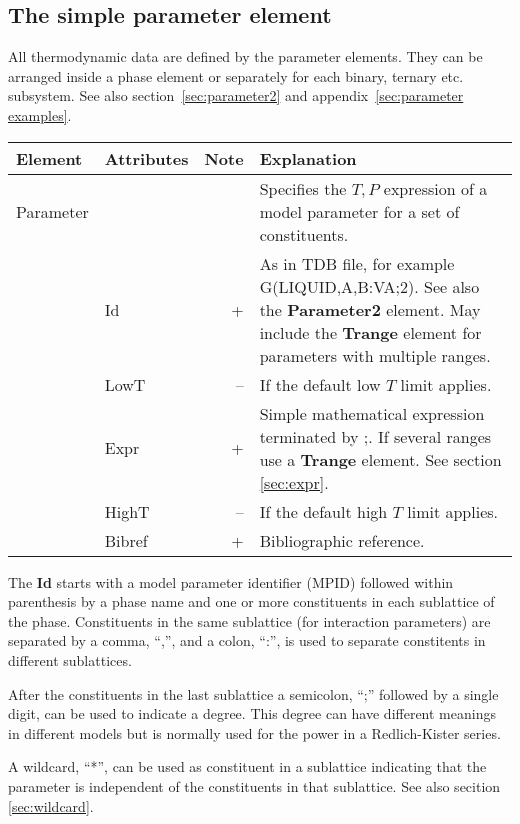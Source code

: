 \documentclass{article}
\begin{document}

\newpage 

\subsection{The simple parameter element}

All thermodynamic data are defined by the parameter elements.  They
can be arranged inside a phase element or separately for each binary,
ternary etc. subsystem.  See also section~\ref{sec:parameter2} and
  appendix~\ref{sec:parameter examples}.

\bigskip
\begin{tabular}{|p{} p{} r p{}|}\hline
  Element & Attributes & Note & Explanation\\\hline

  Parameter & && Specifies the $T, P$ expression of a model parameter for a set of constituents.\\
      & Id & + & As in TDB file, for example G(LIQUID,A,B:VA;2).  See also the {\bf Parameter2} element.  May include the {\bf Trange} element for parameters with multiple ranges.\\
      & LowT & -- & If the default low $T$ limit applies.\\
      & Expr & + & Simple mathematical expression terminated by ;.  If several ranges use a {\bf Trange} element.  See section \ref{sec:expr}.\\
      & HighT & -- & If the default high $T$ limit applies.\\
      & Bibref & + & Bibliographic reference.\\\hline
\end{tabular}

The {\bf Id} starts with a model parameter identifier (MPID) followed
within parenthesis by a phase name and one or more constituents in
each sublattice of the phase.  Constituents in the same sublattice
(for interaction parameters) are separated by a comma, ``,'', and a
colon, ``:'', is used to separate constitents in different
sublattices.

After the constituents in the last sublattice a semicolon, ``;''
followed by a single digit, can be used to indicate a degree.  This
degree can have different meanings in different models but is normally
used for the power in a Redlich-Kister series.

A wildcard, ``*'', can be used as constituent in a sublattice
indicating that the parameter is independent of the constituents in
that sublattice.  See also secition \ref{sec:wildcard}.
\end{document}
